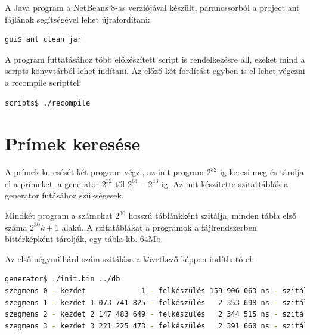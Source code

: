 \documentclass[12pt]{report}
\begin{document}

A Java program a NetBeans 8-as verziójával készült,
parancssorból a project ant fájlának segítségével lehet
újrafordítani:
{\tiny
\begin{lstlisting}[language=bash]
gui$ ant clean jar
\end{lstlisting}
}

A program futtatásához több előkészített script is rendelkezésre áll,
ezeket mind a scripts könyvtárból lehet indítani.
Az előző két fordítást egyben is el lehet végezni a recompile scripttel:
{\tiny
\begin{lstlisting}[language=bash]
scripts$ ./recompile
\end{lstlisting}
}

\section{Prímek keresése}

A prímek keresését két program végzi, az init program
$2^{32}$-ig keresi meg és tárolja el a prímeket,
a generator $2^{32}$-től $2^{64}-2^{43}$-ig.
Az init készítette szitattáblák a generator futásához szükségesek.

Mindkét program a számokat $2^{30}$ hosszú táblánkként szitálja,
minden tábla első száma $2^{30}k+1$ alakú. A szitatáblákat a programok a
fájlrendszerben bittérképként tárolják, egy tábla kb. $64$Mb.  %

Az első négymilliárd szám szitálása a következő képpen indítható el:

{\tiny
\begin{lstlisting}[language=bash]
generator$ ./init.bin ../db
szegmens 0 - kezdet             1 - felkészülés 159 906 063 ns - szitálás 1 122 878 403 ns
szegmens 1 - kezdet 1 073 741 825 - felkészülés   2 353 698 ns - szitálás 1 171 101 336 ns
szegmens 2 - kezdet 2 147 483 649 - felkészülés   2 344 515 ns - szitálás 1 188 330 478 ns
szegmens 3 - kezdet 3 221 225 473 - felkészülés   2 391 660 ns - szitálás 1 199 900 603 ns
\end{lstlisting}
}
\end{document}
